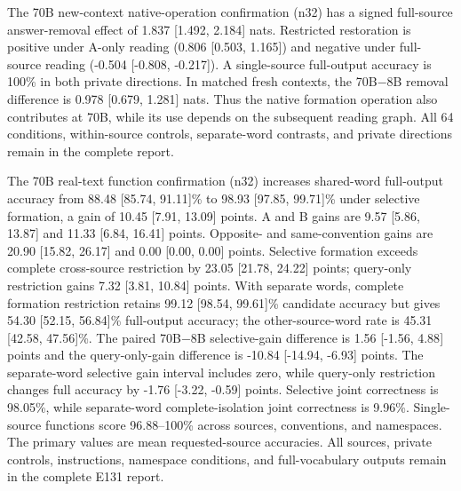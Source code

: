 \documentclass[11pt]{article}
\begin{document}
The 70B new-context native-operation confirmation (n32) has a signed full-source answer-removal effect of 1.837 {[}1.492, 2.184{]} nats. Restricted restoration is positive under A-only reading (0.806 {[}0.503, 1.165{]}) and negative under full-source reading (-0.504 {[}-0.808, -0.217{]}). A single-source full-output accuracy is 100\% in both private directions. In matched fresh contexts, the 70B−8B removal difference is 0.978 {[}0.679, 1.281{]} nats. Thus the native formation operation also contributes at 70B, while its use depends on the subsequent reading graph. All 64 conditions, within-source controls, separate-word contrasts, and private directions remain in the complete report.

The 70B real-text function confirmation (n32) increases shared-word full-output accuracy from 88.48 {[}85.74, 91.11{]}\% to 98.93 {[}97.85, 99.71{]}\% under selective formation, a gain of 10.45 {[}7.91, 13.09{]} points. A and B gains are 9.57 {[}5.86, 13.87{]} and 11.33 {[}6.84, 16.41{]} points. Opposite- and same-convention gains are 20.90 {[}15.82, 26.17{]} and 0.00 {[}0.00, 0.00{]} points. Selective formation exceeds complete cross-source restriction by 23.05 {[}21.78, 24.22{]} points; query-only restriction gains 7.32 {[}3.81, 10.84{]} points. With separate words, complete formation restriction retains 99.12 {[}98.54, 99.61{]}\% candidate accuracy but gives 54.30 {[}52.15, 56.84{]}\% full-output accuracy; the other-source-word rate is 45.31 {[}42.58, 47.56{]}\%. The paired 70B−8B selective-gain difference is 1.56 {[}-1.56, 4.88{]} points and the query-only-gain difference is -10.84 {[}-14.94, -6.93{]} points. The separate-word selective gain interval includes zero, while query-only restriction changes full accuracy by -1.76 {[}-3.22, -0.59{]} points. Selective joint correctness is 98.05\%, while separate-word complete-isolation joint correctness is 9.96\%. Single-source functions score 96.88--100\% across sources, conventions, and namespaces. The primary values are mean requested-source accuracies. All sources, private controls, instructions, namespace conditions, and full-vocabulary outputs remain in the complete E131 report.
\end{document}

